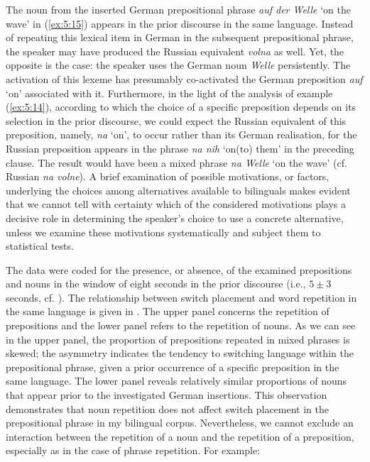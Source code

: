 \noindent The noun from the inserted German prepositional phrase \textit{auf der Welle} `on the wave' in (\ref{ex:5:15}) appears in the prior discourse in the same language. Instead of repeating this lexical item in German in the subsequent prepositional phrase, the speaker may have produced the Russian equivalent \textit{volna} as well. Yet, the opposite is the case: the speaker uses the German noun \textit{Welle} persistently. The activation of this lexeme has presumably co-activated the German preposition \textit{auf} `on' associated with it. Furthermore, in the light of the analysis of example (\ref{ex:5:14}), according to which the choice of a specific preposition depends on its selection in the prior discourse, we could expect the Russian equivalent of this preposition, namely, \textit{na} `on', to occur rather than its German realisation, for the Russian preposition appears in the phrase \textit{na nih} `on(to) them' in the preceding clause. The result would have been a mixed phrase \textit{na Welle} `on the wave' (cf. Russian \textit{na volne}). A brief examination of possible motivations, or factors, underlying the choices among alternatives available to bilinguals makes evident that we cannot tell with certainty which of the considered motivations plays a decisive role in determining the speaker's choice to use a concrete alternative, unless we examine these motivations systematically and subject them to statistical tests.

The data were coded for the presence, or absence, of the examined prepositions and nouns in the window of eight seconds in the prior discourse (i.e., $5 \pm 3$ seconds, cf. \citealt[189]{szmrecsanyi2006}). The relationship between switch placement and word repetition in the same language is given in . The upper panel concerns the repetition of prepositions and the lower panel refers to the repetition of nouns. As we can see in the upper panel, the proportion of prepositions repeated in mixed phrases is skewed; the asymmetry indicates the tendency to switching language within the prepositional phrase, given a prior occurrence of a specific preposition in the same language. The lower panel reveals relatively similar proportions of nouns that appear prior to the investigated German insertions. This observation demonstrates that noun repetition does not affect switch placement in the prepositional phrase in my bilingual corpus. Nevertheless, we cannot exclude an interaction between the repetition of a noun and the repetition of a preposition, especially as in the case of phrase repetition. For example:

